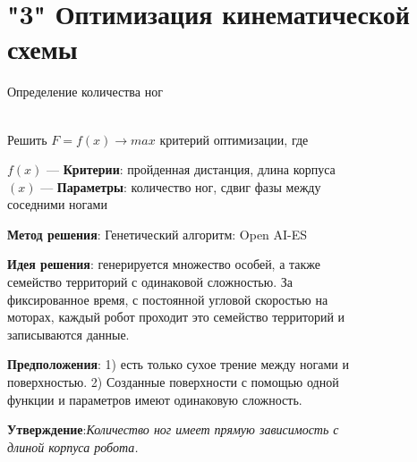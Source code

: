 \section{"3" Оптимизация кинематической схемы}

\begin{frame}[t]{Определение количества ног}
    \framesubtitle{}
    \begin{columns}[T,onlytextwidth]
        \begin{column}{0.59\textwidth}
            \small
            Решить $F=f(x) \rightarrow max$ критерий оптимизации, где

            $f(x)$ --- \textbf{ Критерии}: пройденная дистанция, длина корпуса\\
            $(x)$ --- \textbf{Параметры}: количество ног, сдвиг фазы между
            соседними ногами

            \textbf{Метод решения}: Генетический алгоритм: Open AI-ES

            \textbf{Идея решения}: генерируется множество особей, а
            также семейство территорий с одинаковой сложностью.
            За фиксированное время, с постоянной угловой скоростью
            на моторах, каждый робот проходит это семейство
            территорий и записываются данные.

            \textbf{Предположения}: 1) есть только сухое трение
            между ногами и поверхностью. 2) Созданные
            поверхности с помощью одной функции
            и параметров имеют одинаковую сложность.

            \textbf{Утверждение}:\textit{Количество ног имеет прямую
                зависимость с длиной корпуса робота.}
        \end{column}
        \begin{column}{0.39\textwidth}
            \begin{figure}[H]
                \begin{subfigure}{0.49\textwidth}
                    \centering\includegraphics[height=2cm,width=1\textwidth,keepaspectratio]{../images/terrain_1.jpg}
                \end{subfigure}
                \begin{subfigure}{0.49\textwidth}
                    \centering\includegraphics[height=2cm,width=1\textwidth,keepaspectratio]{../images/terrain_2.jpg}
                \end{subfigure}


\end{figure}
\end{column}
\end{columns}
\end{frame}

